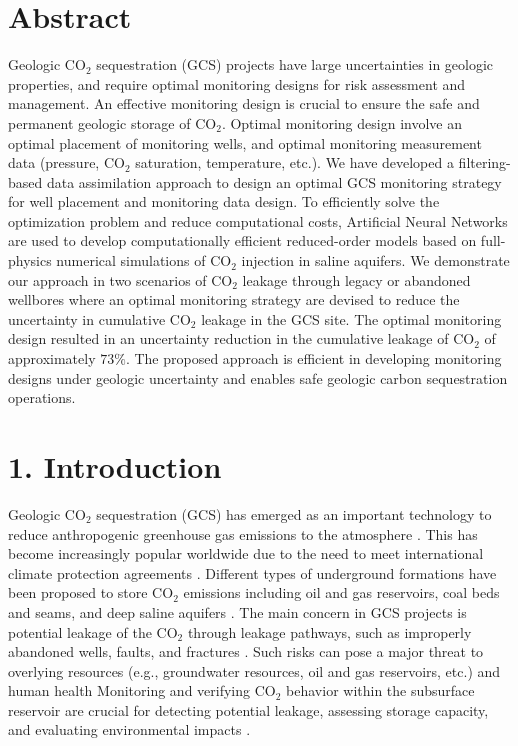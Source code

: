 \documentclass[10pt, twoside]{article}
\begin{document}
\section*{\textbf{Abstract}}
Geologic CO$_2$ sequestration (GCS) projects have large uncertainties in geologic properties, and require optimal monitoring designs for risk assessment and management. An effective monitoring design is crucial to ensure the safe and permanent geologic storage of CO$_2$. Optimal monitoring design involve an optimal placement of monitoring wells, and optimal monitoring measurement data (pressure, CO$_2$ saturation, temperature, etc.). We have developed a filtering-based data assimilation approach to design an optimal GCS monitoring strategy for well placement and monitoring data design. To efficiently solve the optimization problem and reduce computational costs, Artificial Neural Networks are used to develop computationally efficient reduced-order models based on full-physics numerical simulations of CO$_2$ injection in saline aquifers. We demonstrate our approach in two scenarios of CO$_2$ leakage through legacy or abandoned wellbores where an optimal monitoring strategy are devised to reduce the uncertainty in cumulative CO$_2$ leakage in the GCS site. The optimal monitoring design resulted in an uncertainty reduction in the cumulative leakage of CO$_2$ of approximately $73\%$. The proposed approach is efficient in developing monitoring designs under geologic uncertainty and enables safe geologic carbon sequestration operations.

\section*{\textbf{1. Introduction}}
Geologic CO$_2$ sequestration (GCS) has emerged as an important technology to reduce anthropogenic greenhouse gas emissions to the atmosphere \citep{Metz2005,Michael2010,Kopp2010867, Goodman2013329, Castelletto2013570, Li2015389, Levine201681, krevorCCS2018}. This has become increasingly popular worldwide due to the need to meet international climate protection agreements \citep{Energy20202010EuropeanCommission, Unitednations2015AgreementP}. Different types of underground formations have been proposed to store CO$_2$ emissions including oil and gas reservoirs, coal beds and seams, and deep saline aquifers \citep{Dai2016CO2Sites}. The main concern in GCS projects is potential leakage of the CO$_2$ through leakage pathways, such as improperly abandoned wells, faults, and fractures \citep{Metz2005, Harp2016150, Song2012, Sifuentes2009148, Nordbotten2012234}. Such risks can pose a major threat to overlying resources (e.g., groundwater resources, oil and gas reservoirs, etc.) and human health \citep{Benson2003, Keating2016319} Monitoring and verifying CO$_2$ behavior within the subsurface reservoir are crucial for detecting potential leakage, assessing storage capacity, and evaluating environmental impacts \citep{Condor20114036, DeLary201550, Li2016249}.
\end{document}

